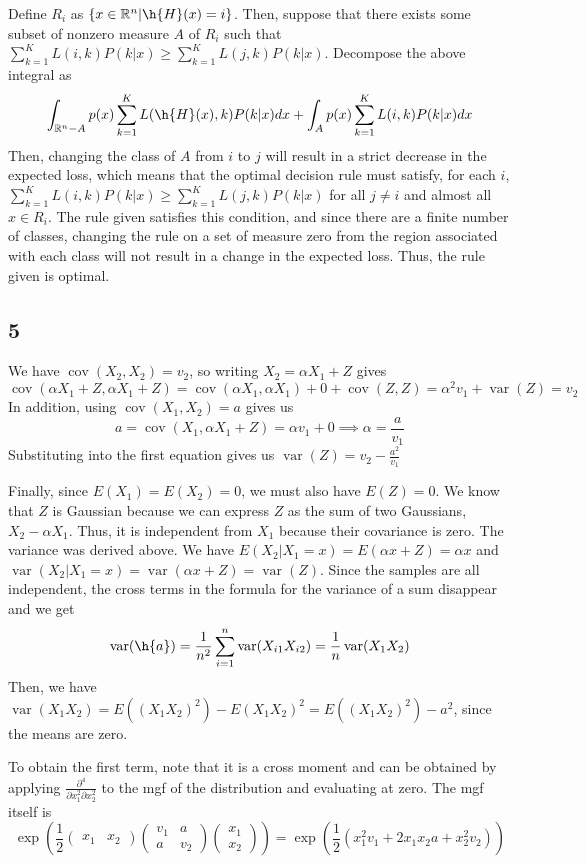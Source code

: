 \documentclass{article}
\newcommand{\openm}{\begin{pmatrix}}
\newcommand{\closem}{\end{pmatrix}}
\DeclareMathOperator{\cov}{cov}
\DeclareMathOperator{\var}{var}
\newcommand{\rn}{\mathbb{R}}
\begin{document}
Define $R_i$ as $\{x\in\rn^n|\h{H}(x)=i\}$. Then, suppose that there exists some subset of nonzero measure $A$ of $R_i$ such that $\sum_{k=1}^KL(i, k)P(k|x)\ge\sum_{k=1}^KL(j, k)P(k|x)$. Decompose the above integral as
\[\int_{\rn^n-A}p(x)\sum_{k=1}^KL(\h{H}(x), k)P(k|x)dx+\int_Ap(x)\sum_{k=1}^KL(i, k)P(k|x)dx\]
Then, changing the class of $A$ from $i$ to $j$ will result in a strict decrease in the expected loss, which means that the optimal decision rule must satisfy, for each $i$, $\sum_{k=1}^KL(i, k)P(k|x)\ge\sum_{k=1}^KL(j, k)P(k|x)$ for all $j\neq i$ and almost all $x\in R_i$. The rule given satisfies this condition, and since there are a finite number of classes, changing the rule on a set of measure zero from the region associated with each class will not result in a change in the expected loss. Thus, the rule given is optimal.
\subsection*{5}
We have $\cov(X_2,X_2)=v_2$, so writing $X_2=\alpha X_1+Z$ gives
\[\cov(\alpha X_1+Z, \alpha X_1+Z)=\cov(\alpha X_1, \alpha X_1)+0+\cov(Z, Z)=\alpha^2v_1+\var(Z)=v_2\]
In addition, using $\cov(X_1, X_2)=a$ gives us
\[a=\cov(X_1, \alpha X_1+Z)=\alpha v_1+0\implies \alpha=\frac{a}{v_1}\]
Substituting into the first equation gives us $\var(Z)=v_2-\frac{a^2}{v_1}$

Finally, since $E(X_1)=E(X_2)=0$, we must also have $E(Z)=0$.
We know that $Z$ is Gaussian because we can express $Z$ as the sum of two Gaussians, $X_2-\alpha X_1$. Thus, it is independent from $X_1$ because their covariance is zero. The variance was derived above.
We have $E(X_2|X_1=x)=E(\alpha x+Z)=\alpha x$ and $\var(X_2|X_1=x)=\var(\alpha x+Z)=\var(Z)$. 
Since the samples are all independent, the cross terms in the formula for the variance of a sum disappear and we get
\[\var(\h{a})=\frac{1}{n^2}\sum_{i=1}^n\var(X_{i1}X_{i2})=\frac{1}{n}\var(X_1X_2)\]
Then, we have $\var(X_1X_2)=E((X_1X_2)^2)-E(X_1X_2)^2=E((X_1X_2)^2)-a^2$, since the means are zero.

To obtain the first term, note that it is a cross moment and can be obtained by applying $\frac{\partial^4}{\partial x_1^2\partial x_2^2}$ to the mgf of the distribution and evaluating at zero. The mgf itself is
\[\exp\left(\frac{1}{2}\openm x_1&x_2\closem\openm v_1&a\\a&v_2\closem\openm x_1\\x_2\closem\right)=\exp\left(\frac{1}{2}(x_1^2v_1+2x_1x_2a+x_2^2v_2)\right)\]
\end{document}
